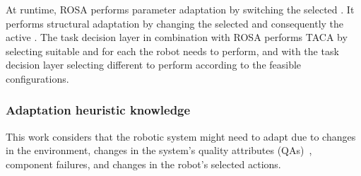 At runtime, ROSA performs parameter adaptation by switching the selected . It performs structural adaptation by changing the selected  and consequently the active . The task decision layer in combination with ROSA performs TACA by selecting suitable  and  for each  the robot needs to perform, and with the task decision layer selecting different  to perform according to the feasible configurations.


\subsubsection{Adaptation heuristic knowledge}
This work considers that the robotic system might need to adapt due to changes in the environment, changes in the system's quality attributes (QAs)~\citep{wiki:sebok}, component failures, and changes in the robot's selected actions.

